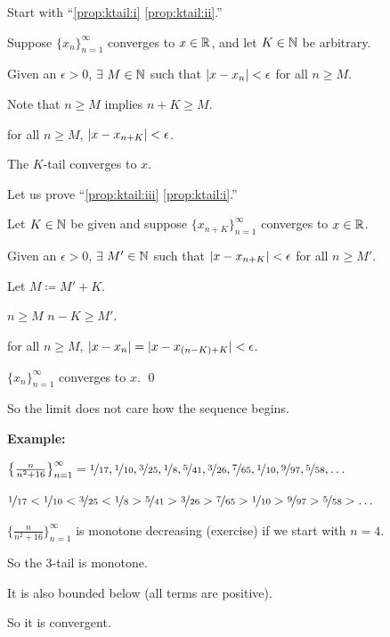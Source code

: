 \documentclass[10pt,aspectratio=149]{beamer}
\begin{document}
\begin{frame}
Start with ``\eqref{prop:ktail:i} \thus \eqref{prop:ktail:ii}.''

\pause
Suppose $\{x_n \}_{n=1}^\infty$ converges to $x \in {\mathbb{R}}$, and let $K \in {\mathbb{N}}$ be arbitrary.

\pause
Given an $\epsilon > 0$, $\exists$ $M \in {\mathbb{N}}$ such that
$\lvert {x-x_n} \rvert < \epsilon$ for all $n \geq M$.

\pause
Note that $n \geq M$ implies $n+K \geq M$.

\pause
\thus \quad for all $n \geq M$, \quad
$\lvert {x-x_{n+K}} \rvert < \epsilon$.

\pause
\thus \quad The $K$-tail converges to $x$.

\medskip
\pause

Let us prove ``\eqref{prop:ktail:iii} \thus \eqref{prop:ktail:i}.''

\pause
Let $K \in {\mathbb{N}}$ be given and suppose $\{ x_{n+K} \}_{n=1}^\infty$ converges to $x \in {\mathbb{R}}$.

\pause
Given an $\epsilon > 0$, $\exists$ $M' \in {\mathbb{N}}$ such that
$\lvert {x-x_{n+K}} \rvert < \epsilon$ for all $n \geq M'$.

\pause
Let $M \coloneqq M'+K$.

\pause
$n \geq M$ \wthus $n-K \geq M'$.

\pause
\thus \quad for all $n \geq M$, \quad
$\lvert {x-x_n} \rvert = \lvert {x-x_{(n-K)+K}} \rvert < \epsilon$.

\pause
\thus \quad $\{ x_n \}_{n=1}^\infty$ converges to $x$.
\qed

\end{frame}

\begin{frame}
So the limit does not care how the sequence begins.

\medskip
\pause

\textbf{Example:}
\medskip

$\bigl\{\frac{n}{n^2+16} \bigr\}_{n=1}^\infty =
\nicefrac{1}{17},
\nicefrac{1}{10},
\nicefrac{3}{25},
\nicefrac{1}{8},
\nicefrac{5}{41},
\nicefrac{3}{26},
\nicefrac{7}{65},
\nicefrac{1}{10},
\nicefrac{9}{97},
\nicefrac{5}{58},\ldots$

\pause
\medskip

$
\nicefrac{1}{17} <
\nicefrac{1}{10} <
\nicefrac{3}{25} <
\nicefrac{1}{8} >
\nicefrac{5}{41} >
\nicefrac{3}{26} >
\nicefrac{7}{65} >
\nicefrac{1}{10} >
\nicefrac{9}{97} >
\nicefrac{5}{58} > \ldots$

\medskip
\pause

$\bigl\{\frac{n}{n^2+16} \bigr\}_{n=1}^\infty$ is monotone decreasing (exercise) if we start with $n=4$.

\medskip
\pause

So the 3-tail is monotone.

\medskip
\pause

It is also bounded below (all terms are positive).

\medskip
\pause

So it is convergent.
\end{frame}
\end{document}
